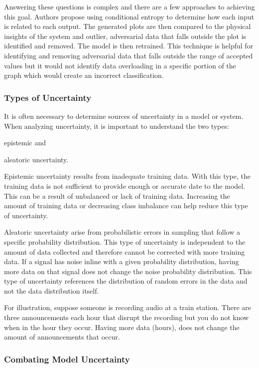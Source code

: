 Answering these questions is complex and there are a few approaches to achieving this goal. Authors \cite{black-box-explainability} propose using conditional entropy to determine how each input is related to each output. The generated plots are then compared to the physical insights of the system and outlier, adversarial data that falls outside the plot is identified and removed. The model is then retrained. This technique is helpful for identifying and removing adversarial data that falls outside the range of accepted values but it would not identify data overloading in a specific portion of the graph which would create an incorrect classification.

\subsubsection{Types of Uncertainty}
It is often necessary to determine sources of uncertainty in a model or system. When analyzing uncertainty, it is important to understand the two types:
\begin{inlinelist}
    \item epistemic and
    \item aleatoric uncertainty.
\end{inlinelist}

Epistemic uncertainty results from inadequate training data. With this type, the training data is not sufficient to provide enough or accurate date to the model. This can be a result of unbalanced or lack of training data. Increasing the amount of training data or decreasing class imbalance can help reduce this type of uncertainty. 

Aleatoric uncertainty arise from probabilistic errors in sampling that follow a specific probability distribution. This type of uncertainty is independent to the amount of data collected and therefore cannot be corrected with more training data. If a signal has noise inline with a given probability distribution, having more data on that signal does not change the noise probability distribution. This type of uncertainty references the distribution of random errors in the data and not the data distribution itself.

For illustration, suppose someone is recording audio at a train station. There are three announcements each hour that disrupt the recording but you do not know when in the hour they occur. Having more data (hours), does not change the amount of announcements that occur. 

\subsubsection{Combating Model Uncertainty}

